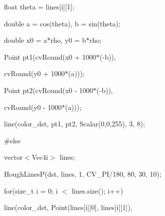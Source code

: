 {\ttfamily }

{\ttfamily float theta = lines\mbox{[}i\mbox{]}\mbox{[}1\mbox{]};}

{\ttfamily }

{\ttfamily }

{\ttfamily double a = cos(theta), b = sin(theta);}

{\ttfamily }

{\ttfamily }

{\ttfamily double x0 = a$\ast$rho, y0 = b$\ast$rho;}

{\ttfamily }

{\ttfamily }

{\ttfamily Point pt1(cv\+Round(x0 + 1000$\ast$(-\/b)),}

{\ttfamily }

{\ttfamily }

{\ttfamily cv\+Round(y0 + 1000$\ast$(a)));}

{\ttfamily }

{\ttfamily }

{\ttfamily Point pt2(cv\+Round(x0 -\/ 1000$\ast$(-\/b)),}

{\ttfamily }

{\ttfamily }

{\ttfamily cv\+Round(y0 -\/ 1000$\ast$(a)));}

{\ttfamily }

{\ttfamily }

{\ttfamily line(color\+\_\+dst, pt1, pt2, Scalar(0,0,255), 3, 8);}

{\ttfamily }

{\ttfamily }

{\ttfamily \#else}

{\ttfamily }

{\ttfamily }

{\ttfamily vector$<$\+Vec4i$>$ lines;}

{\ttfamily }

{\ttfamily }

{\ttfamily Hough\+LinesP(dst, lines, 1, C\+V\+\_\+\+P\+I/180, 80, 30, 10);}

{\ttfamily }

{\ttfamily }

{\ttfamily for(size\+\_\+t i = 0; i $<$ lines.\+size(); i++)}

{\ttfamily }

{\ttfamily }

{\ttfamily line(color\+\_\+dst, Point(lines\mbox{[}i\mbox{]}\mbox{[}0\mbox{]}, lines\mbox{[}i\mbox{]}\mbox{[}1\mbox{]}),}

